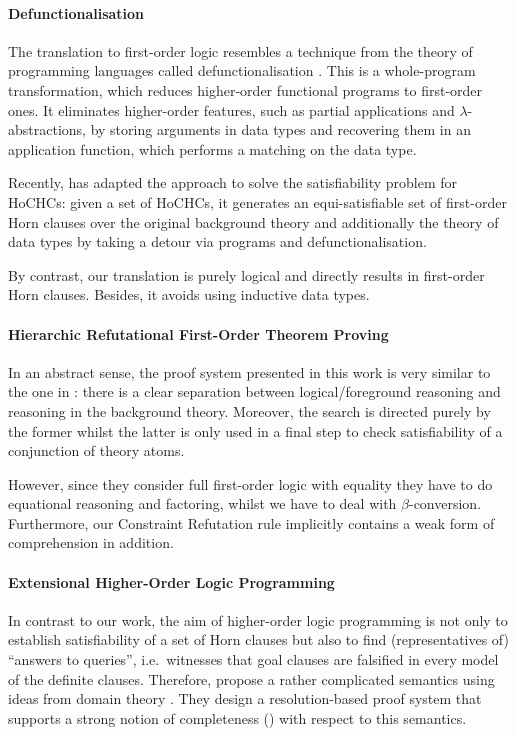 \documentclass[a4paper,twoside,notitlepage,openright,11pt]{report}
\begin{document}
\paragraph{Defunctionalisation}
The translation to first-order logic resembles a technique from the theory of programming languages called defunctionalisation \cite{R72}. This is a whole-program transformation, which reduces higher-order functional programs to first-order ones. It eliminates higher-order features, such as partial applications and \mbox{$\lambda$-abstractions,} by storing arguments in data types and recovering them in an application function, which performs a matching on the data type.

Recently, \cite{P18} has adapted the approach to solve the satisfiability problem for HoCHCs: given a set of HoCHCs, it generates an equi-satisfiable set of first-order Horn clauses over the original background theory and additionally the theory of data types by taking a detour via programs and defunctionalisation.

By contrast, our translation is purely logical and directly results in first-order Horn clauses. Besides, it avoids using inductive data types.

\paragraph{Hierarchic Refutational First-Order Theorem Proving}
In an abstract sense, the proof system presented in this work is very similar to the one in \cite{BGW94,AKW09}: there is a clear separation between logical/foreground reasoning and reasoning in the background theory. Moreover, the search is directed purely by the former whilst the latter is only used in a final step to check satisfiability of a conjunction of theory atoms.

However, since they consider full first-order logic with equality they have to do equational reasoning and factoring, whilst we have to deal with $\beta$-conversion. Furthermore, our Constraint Refutation rule implicitly contains a weak form of comprehension in addition.

\paragraph{Extensional Higher-Order Logic Programming}
In contrast to our work, the aim of higher-order logic programming is not only to establish satisfiability of a set of Horn clauses but also to find (representatives of) ``answers to queries'', i.e.\ witnesses that goal clauses are falsified in every model of the definite clauses. Therefore, \cite{CHRW13} propose a rather complicated semantics using ideas from domain theory \cite{AJ95}. 
They design a resolution-based proof system that supports a strong notion of completeness (\cite[Theorem 7.38]{CHRW13}) with respect to this semantics.
\end{document}
